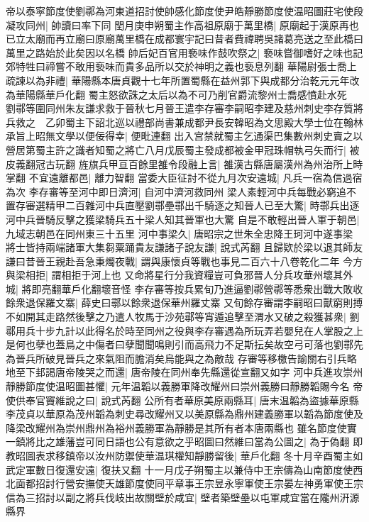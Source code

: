 帝以泰寜節度使劉鄩為河東道招討使帥感化節度使尹皓靜勝節度使温昭圖莊宅使段凝攻同州|{
	帥讀曰率下同}
閏月庚申朔蜀主作高祖原廟于萬里橋|{
	原廟起于漢原再也已立太廟而再立廟曰原廟萬里橋在成都寰宇記曰昔者費禕聘吳諸葛亮送之至此橋曰萬里之路始於此矣因以名橋}
帥后妃百官用䙝味作鼓吹祭之|{
	䙝味嘗御嗜好之味也記郊特牲曰禘嘗不敢用䙝味而貴多品所以交於神明之義也䙝息列翻}
華陽尉張士喬上疏諫以為非禮|{
	華陽縣本唐貞觀十七年所置蜀縣在益州郭下與成都分治乾元元年改為華陽縣華戶化翻}
蜀主怒欲誅之太后以為不可乃削官爵流黎州士喬感憤赴水死　劉鄩等圍同州朱友謙求救于晉秋七月晉王遣李存審李嗣昭李建及慈州刺史李存質將兵救之　乙卯蜀主下詔北巡以禮部尚書兼成都尹長安韓昭為文思殿大學士位在翰林承旨上昭無文學以便佞得幸|{
	便毗連翻}
出入宫禁就蜀主乞通渠巴集數州刺史賣之以營居第蜀主許之識者知蜀之將亡八月戊辰蜀主發成都被金甲冠珠帽執弓矢而行|{
	被皮義翻冠古玩翻}
旌旗兵甲亘百餘里雒令段融上言|{
	雒漢古縣唐屬漢州為州治所上時掌翻}
不宜遠離都邑|{
	離力智翻}
當委大臣征討不從九月次安遠城|{
	凡兵一宿為信過宿為次}
李存審等至河中即日濟河|{
	自河中濟河救同州}
梁人素輕河中兵每戰必窮追不置存審選精甲二百雜河中兵直壓劉鄩壘鄩出千騎逐之知晉人已至大驚|{
	時鄩兵出逐河中兵晉騎反擊之獲梁騎兵五十梁人知其晉軍也大驚}
自是不敢輕出晉人軍于朝邑|{
	九域志朝邑在同州東三十五里}
河中事梁久|{
	唐昭宗之世朱全忠降王珂河中遂事梁}
將士皆持兩端諸軍大集芻粟踊貴友謙諸子說友謙|{
	說式芮翻}
且歸欵於梁以退其師友謙曰昔晉王親赴吾急秉燭夜戰|{
	謂與康懷貞等戰也事見二百六十八卷乾化二年}
今方與梁相拒|{
	謂相拒于河上也}
又命將星行分我資糧豈可負邪晉人分兵攻華州壞其外城|{
	將即亮翻華戶化翻壞音怪}
李存審等按兵累旬乃進逼劉鄩營鄩等悉衆出戰大敗收餘衆退保羅文寨|{
	薛史曰鄩以餘衆退保華州羅丈寨}
又旬餘存審謂李嗣昭曰獸窮則搏不如開其走路然後擊之乃遣人牧馬于沙苑鄩等宵遁追擊至渭水又破之殺獲甚衆|{
	劉鄩用兵十步九計以此得名於時至同州之役與李存審遇為所玩弄若嬰兒在人掌股之上是何也孽也蓋鳥之中傷者曰孽聞聞鳴則引而高飛力不足斯抎矣故空弓可落也劉鄩先為晉兵所破見晉兵之來氣阻而膽消矣烏能與之為敵哉}
存審等移檄告諭關右引兵略地至下邽謁唐帝陵哭之而還|{
	唐帝陵在同州奉先縣還從宣翻又如字}
河中兵進攻崇州靜勝節度使温昭圖甚懼|{
	元年温韜以義勝軍降改耀州曰崇州義勝曰靜勝韜賜今名}
帝使供奉官竇維說之曰|{
	說式芮翻}
公所有者華原美原兩縣耳|{
	唐末温韜為盜據華原縣李茂貞以華原為茂州韜為刺史尋改耀州又以美原縣為鼎州建義勝軍以韜為節度使及降梁改耀州為崇州鼎州為裕州義勝軍為靜勝是其所有者本唐兩縣也}
雖名節度使實一鎮將比之雄藩豈可同日語也公有意欲之乎昭圖曰然維曰當為公圖之|{
	為于偽翻}
即教昭圖表求移鎮帝以汝州防禦使華温琪權知靜勝留後|{
	華戶化翻}
冬十月辛酉蜀主如武定軍數日復還安遠|{
	復扶又翻}
十一月戊子朔蜀主以兼侍中王宗儔為山南節度使西北面都招討行營安撫使天雄節度使同平章事王宗昱永寧軍使王宗晏左神勇軍使王宗信為三招討以副之將兵伐岐出故關壁於咸宜|{
	壁者築壁壘以屯軍咸宜當在隴州汧源縣界}
